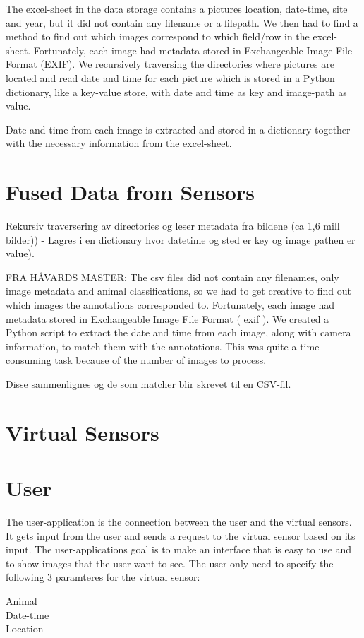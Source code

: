 \documentclass[USenglish]{uit-thesis}
\begin{document}
The excel-sheet in the data storage contains a pictures location, date-time, site and year, but it did not contain any filename or a filepath. We then had to find a method to find out which images correspond to which field/row in the excel-sheet. Fortunately, each image had metadata stored in Exchangeable Image File Format (EXIF). We recursively traversing the directories where pictures are located and read date and time for each picture which is stored in a Python dictionary, like a key-value store, with date and time as key and image-path as value.


Date and time from each image is extracted and stored in a dictionary together with the necessary information from the excel-sheet.


\section{Fused Data from Sensors}




Rekursiv traversering av directories og leser metadata fra bildene (ca 1,6 mill bilder)) - Lagres i en dictionary hvor datetime og sted er key og image pathen er value).


FRA HÅVARDS MASTER: The csv files did not contain any filenames,
only image metadata and animal classifications, so we had to get creative
to find out which images the annotations corresponded to. Fortunately, each
image had metadata stored in Exchangeable Image File Format ( exif ). We
created a Python script to extract the date and time from each image, along
with camera information, to match them with the annotations. This was quite
a time-consuming task because of the number of images to process.

Disse sammenlignes og de som matcher blir skrevet til en CSV-fil.
\section{Virtual Sensors}
\section{User}
The user-application is the connection between  the user and the virtual sensors. It gets input from the user and sends a request to the virtual sensor based on its input. The user-applications goal is to make an interface that is easy to use and to show images that the user want to see.
The user only need to specify the following 3 paramteres for the virtual sensor:
\begin{description}
\item [Animal]
\item [Date-time]
\item [Location]
\end{description}
\end{document}
